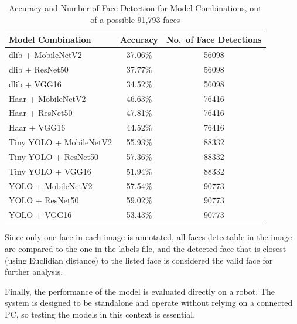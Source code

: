 \begin{table}[h!]
\centering{}
\caption{Accuracy and Number of Face Detection for Model Combinations, out of a possible 91,793 faces}
\begin{tabular}{|l|c|c|}
\hline
\textbf{Model Combination}   & \textbf{Accuracy} & \textbf{No.\ of Face Detections}         \\ \hline
dlib + MobileNetV2           & 37.06\%            & 56098                                   \\ \hline
dlib + ResNet50              & 37.77\%            & 56098                                   \\ \hline
dlib + VGG16                 & 34.52\%            & 56098                                   \\ \hline
Haar + MobileNetV2           & 46.63\%            & 76416                                   \\ \hline
Haar + ResNet50              & 47.81\%            & 76416                                   \\ \hline
Haar + VGG16                 & 44.52\%            & 76416                                   \\ \hline
Tiny YOLO + MobileNetV2      & 55.93\%            & 88332                                   \\ \hline
Tiny YOLO + ResNet50         & 57.36\%            & 88332                                   \\ \hline
Tiny YOLO + VGG16            & 51.94\%            & 88332                                   \\ \hline
YOLO + MobileNetV2           & 57.54\%            & 90773                                   \\ \hline
YOLO + ResNet50              & 59.02\%            & 90773                                   \\ \hline
YOLO + VGG16                 & 53.43\%            & 90773                                   \\ \hline
\end{tabular}
\label{tab:model_combinations_accuracy}
\end{table}

Since only one face in each image is annotated, all faces detectable in the image are compared to the one in the labels file, and the detected face that is closest (using Euclidian distance) to the listed face is considered the valid face for further analysis.

Finally, the performance of the model is evaluated directly on a robot. The system is designed to be standalone and operate without relying on a connected PC, so testing the models in this context is essential.

